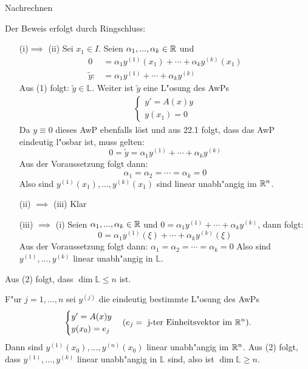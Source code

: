 \documentclass[a4paper,twoside,DIV15,BCOR12mm,chapterprefix=true,headings=twolinechapter]{scrbook}
\begin{document}
\begin{beweise}
\item Nachrechnen

\item Der Beweis erfolgt durch Ringschluss:
\begin{enumerate}
\item[(i)$\implies$ (ii)] Sei $x_1 \in I$. Seien $\alpha_1, ...,  
\alpha_k \in \mathbb{R}$ und 
\begin{align*}
0 &= \alpha_1 y^{(1)}(x_1) + \cdots + \alpha_k y^ {(k)}(x_1)\\ 
\tilde y :&= \alpha_1 y^{(1)} + \cdots + \alpha_k y^{(k)}
\end{align*}  
Aus (1) folgt: $\tilde y \in \mathbb{L}$. Weiter ist $\tilde y$ eine  
L"osung des AwPs
\begin{align*} \begin{cases}
y' = A(x) y\\
y(x_1) = 0
\end{cases} \end{align*}
Da $y \equiv 0$ dieses AwP ebenfalls löst und aus 22.1 folgt, dass das AwP  
eindeutig l"osbar ist, muss gelten:
\[0 = \tilde y = \alpha_1 y^{(1)} + \cdots +  \alpha_k y^{(k)}\]
Aus der Voraussetzung folgt dann: 
\[\alpha_1 = \alpha_2 = \cdots = \alpha_k = 0\] 
Also sind $y^{(1)}(x_1), ..., y^{(k)} (x_1)$ sind linear unabh"angig im $\mathbb{R}^n$.
\item[(ii) $\implies$ (iii)] Klar \checkmark
\item[(iii) $\implies$ (i)]Seien $\alpha_1, ..., \alpha_k \in \mathbb{R}$  
und $0 = \alpha_1 y^{(1)} + \cdots + \alpha_k y^{(k)}$, dann folgt:
\[0 = \alpha_1 y^{(1)}(\xi ) + \cdots + \alpha_k y^{(k)}(\xi )\] 
Aus der Voraussetzung folgt dann: $\alpha_1 = \alpha_2 = \cdots = \alpha_k = 0$  
Also sind $y^{(1)}, ..., y^{(k)}$ linear unabh"angig in $\mathbb{L}$. 
\end{enumerate}

\item Aus (2) folgt, dass $\dim \mathbb{L} \le n$ ist.

F"ur $j = 1,..., n$ sei $y^{(j)}$ die eindeutig bestimmte L"osung des  
AwPs
\begin{align*}
\begin{cases}
y' = A(x) y\\
y(x_0) = e_j
\end{cases}
(e_j = \text{ j-ter Einheitsvektor im }\mathbb{R}^n).
\end{align*}
Dann sind $y^{(1)}(x_0), ..., y^{(n)}(x_0)$ linear unabh"angig im $ 
\mathbb{R}^n$. Aus (2) folgt, dass $y^{(1)}, ..., y^{(k)}$ linear unabh"angig  
in $\mathbb{L}$ sind, also ist $\dim \mathbb{L} \ge n$.
\end{beweise}
\end{document}
